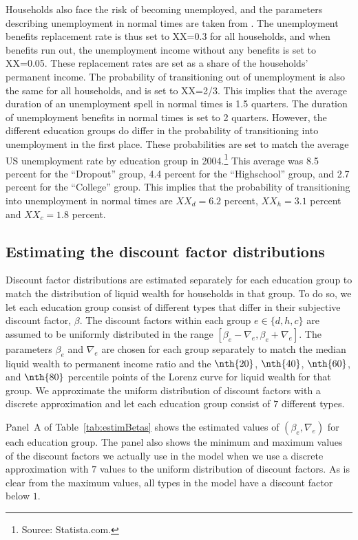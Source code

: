 \documentclass[11pt]{article}
\begin{document}
Households also face the risk of becoming unemployed, and the parameters describing unemployment in normal times are taken from \citet{carroll2020modeling}. The unemployment benefits replacement rate is thus set to XX=0.3 for all households, and when benefits run out, the unemployment income without any benefits is set to XX=0.05. These replacement rates are set as a share of the households' permanent income. The probability of transitioning out of unemployment is also the same for all households, and is set to XX=2/3. This implies that the average duration of an unemployment spell in normal times is 1.5 quarters. The duration of unemployment benefits in normal times is set to 2 quarters. However, the different education groups do differ in the probability of transitioning into unemployment in the first place. These probabilities are set to match the average US unemployment rate by education group in 2004.\footnote{Source: Statista.com.} This average was 8.5 percent for the ``Dropout'' group, 4.4 percent for the ``Highschool'' group, and 2.7 percent for the ``College'' group. This implies that the probability of transitioning into unemployment in normal times are $XX_d=6.2$ percent, $XX_h=3.1$ percent and $XX_c=1.8$ percent. 

\subsection{Estimating the discount factor distributions} 
\label{sec:estimBetas}

Discount factor distributions are estimated separately for each education group to match the distribution of liquid wealth for households in that group. To do so, we let each education group consist of different types that differ in their subjective discount factor, $\beta$. The discount factors within each group $e\in \{d, h, c\}$ are assumed to be uniformly distributed in the range $[\beta_e-\nabla_e, \beta_e+\nabla_e]$. The parameters $\beta_e$ and $\nabla_e$ are chosen for each group separately to match the median liquid wealth to permanent income ratio and the $\nth{20}$, $\nth{40}$, $\nth{60}$, and $\nth{80}$ percentile points of the Lorenz curve for liquid wealth for that group. We approximate the uniform distribution of discount factors with a discrete approximation and let each education group consist of $7$ different types.

Panel~A of Table~\ref{tab:estimBetas} shows the estimated values of $(\beta_e, \nabla_e)$ for each education group. The panel also shows the minimum and maximum values of the discount factors we actually use in the model when we use a discrete approximation with $7$ values to the uniform distribution of discount factors. As is clear from the maximum values, all types in the model have a discount factor below $1$. 
\end{document}
